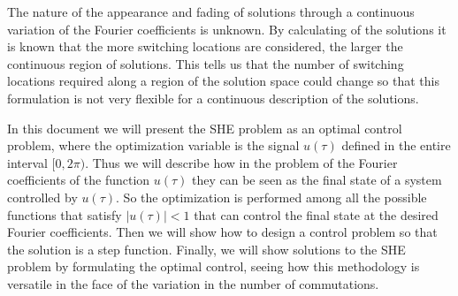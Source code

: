 %
The nature of the appearance and fading of solutions through a continuous variation of the Fourier coefficients is unknown.
%
By calculating of the solutions it is known that the more switching locations are considered, the larger the continuous region of solutions.
%
This tells us that the number of switching locations required along a region of the solution space could change so that this formulation is not very flexible for a continuous description of the solutions.
\newline

%
In this document we will present the SHE problem as an optimal control problem, where the optimization variable is the signal $ u (\tau) $ defined in the entire interval $ [0,2 \pi) $.
%
Thus we will describe how in the problem of the Fourier coefficients of the function $ u (\tau) $ they can be seen as the final state of a system controlled by $ u (\tau) $.
%
So the optimization is performed among all the possible functions that satisfy $ | u (\tau) | <1 $ that can control the final state at the desired Fourier coefficients.
%
Then we will show how to design a control problem so that the solution is a step function.
%
Finally, we will show solutions to the SHE problem by formulating the optimal control, seeing how this methodology is versatile in the face of the variation in the number of commutations.%

